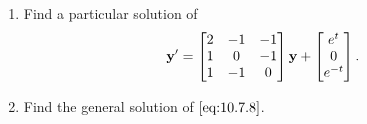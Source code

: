 \documentclass{ximera}
\begin{document}
\begin{example}\label{example:10.7.4} 
\begin{enumerate}
\item\label{item:10.7.4a} %
Find a particular solution of
\begin{equation} \label{eq:10.7.8}
{\bf y}'=\begin{bmatrix}2&-1&-1\\1&0&-1\\1&-1&0\end{bmatrix}{\bf
y}+\begin{bmatrix}e^{t}\\0\\e^{-t}
\end{bmatrix}.
\end{equation}
\item\label{item:10.7.4b} %
Find the general solution of  $\eqref{eq:10.7.8}$.
\end{enumerate}


\end{example}
\end{document}
